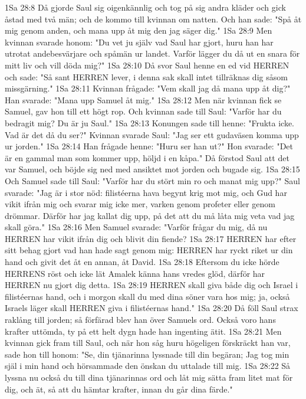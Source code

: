 1Sa 28:8  Då gjorde Saul sig oigenkännlig och tog på sig andra kläder och gick åstad med två män; och de kommo till kvinnan om natten. Och han sade: "Spå åt mig genom anden, och mana upp åt mig den jag säger dig."
1Sa 28:9  Men kvinnan svarade honom: "Du vet ju själv vad Saul har gjort, huru han har utrotat andebesvärjare och spåmän ur landet. Varför lägger du då ut en snara för mitt liv och vill döda mig?"
1Sa 28:10  Då svor Saul henne en ed vid HERREN och sade: "Så sant HERREN lever, i denna sak skall intet tillräknas dig såsom missgärning."
1Sa 28:11  Kvinnan frågade: "Vem skall jag då mana upp åt dig?" Han svarade: "Mana upp Samuel åt mig."
1Sa 28:12  Men när kvinnan fick se Samuel, gav hon till ett högt rop. Och kvinnan sade till Saul: "Varför har du bedragit mig? Du är ju Saul."
1Sa 28:13  Konungen sade till henne: "Frukta icke. Vad är det då du ser?" Kvinnan svarade Saul: "Jag ser ett gudaväsen komma upp ur jorden."
1Sa 28:14  Han frågade henne: "Huru ser han ut?" Hon svarade: "Det är en gammal man som kommer upp, höljd i en kåpa." Då förstod Saul att det var Samuel, och böjde sig ned med ansiktet mot jorden och bugade sig.
1Sa 28:15  Och Samuel sade till Saul: "Varför har du stört min ro och manat mig upp?" Saul svarade: "Jag är i stor nöd: filistéerna hava begynt krig mot mig, och Gud har vikit ifrån mig och svarar mig icke mer, varken genom profeter eller genom drömmar. Därför har jag kallat dig upp, på det att du må låta mig veta vad jag skall göra."
1Sa 28:16  Men Samuel svarade: "Varför frågar du mig, då nu HERREN har vikit ifrån dig och blivit din fiende?
1Sa 28:17  HERREN har efter sitt behag gjort vad han hade sagt genom mig: HERREN har ryckt riket ur din hand och givit det åt en annan, åt David.
1Sa 28:18  Eftersom du icke hörde HERRENS röst och icke lät Amalek känna hans vredes glöd, därför har HERREN nu gjort dig detta.
1Sa 28:19  HERREN skall giva både dig och Israel i filistéernas hand, och i morgon skall du med dina söner vara hos mig; ja, också Israels läger skall HERREN giva i filistéernas hand."
1Sa 28:20  Då föll Saul strax raklång till jorden; så förfärad blev han över Samuels ord. Också voro hans krafter uttömda, ty på ett helt dygn hade han ingenting ätit.
1Sa 28:21  Men kvinnan gick fram till Saul, och när hon såg huru högeligen förskräckt han var, sade hon till honom: "Se, din tjänarinna lyssnade till din begäran; Jag tog min själ i min hand och hörsammade den önskan du uttalade till mig.
1Sa 28:22  Så lyssna nu också du till dina tjänarinnas ord och låt mig sätta fram litet mat för dig, och ät, så att du hämtar krafter, innan du går dina färde."
